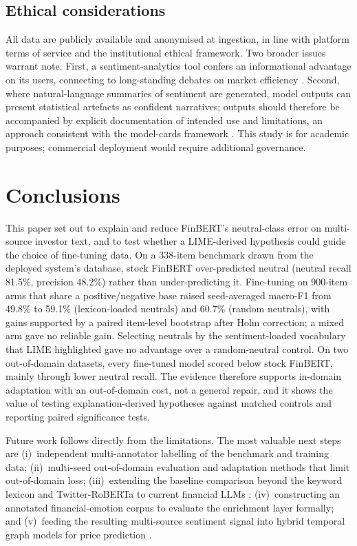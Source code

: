 \documentclass{aims}
\numberwithin{equation}{section}
\begin{document}
\subsection{Ethical considerations}
All data are publicly available and anonymised at ingestion, in line with platform
terms of service and the institutional ethical framework. Two broader issues warrant
note. First, a sentiment-analytics tool confers an informational advantage on its
users, connecting to long-standing debates on market efficiency \citep{fama1970}.
Second, where natural-language summaries of sentiment are generated, model outputs
can present statistical artefacts as confident narratives; outputs should therefore
be accompanied by explicit documentation of intended use and limitations, an approach
consistent with the model-cards framework \citep{mitchell2019}. This study is for
academic purposes; commercial deployment would require additional governance.

\section{Conclusions}\label{sec:conclusion}
This paper set out to explain and reduce FinBERT's neutral-class error on
multi-source investor text, and to test whether a LIME-derived hypothesis could guide
the choice of fine-tuning data. On a 338-item benchmark drawn from the deployed
system's database, stock FinBERT over-predicted neutral (neutral recall 81.5\%,
precision 48.2\%) rather than under-predicting it. Fine-tuning on 900-item arms that
share a positive/negative base raised seed-averaged macro-F1 from 49.8\% to 59.1\%
(lexicon-loaded neutrals) and 60.7\% (random neutrals), with gains supported by a
paired item-level bootstrap after Holm correction; a mixed arm gave no reliable gain.
Selecting neutrals by the sentiment-loaded vocabulary that LIME highlighted gave no
advantage over a random-neutral control. On two out-of-domain datasets, every
fine-tuned model scored below stock FinBERT, mainly through lower neutral recall.
The evidence therefore supports in-domain adaptation with an out-of-domain cost, not
a general repair, and it shows the value of testing explanation-derived hypotheses
against matched controls and reporting paired significance tests.

Future work follows directly from the limitations. The most valuable next steps are
(i)~independent multi-annotator labelling of the benchmark and training data;
(ii)~multi-seed out-of-domain evaluation and adaptation methods that limit
out-of-domain loss; (iii)~extending the baseline comparison beyond the
keyword lexicon and Twitter-RoBERTa to current financial LLMs \citep{wu2023,fatouros2023}; (iv)~constructing
an annotated financial-emotion corpus to evaluate the enrichment layer formally; and
(v)~feeding the resulting multi-source sentiment signal into hybrid temporal graph
models for price prediction \citep{lynch2025}.
\end{document}
